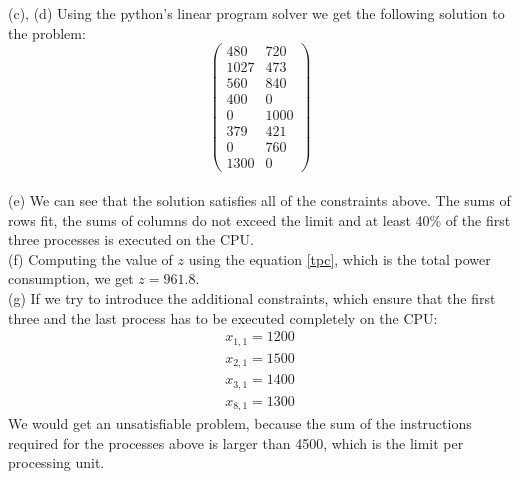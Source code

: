 \documentclass{article}
\begin{document}
(c), (d) Using the python's linear program solver we get the following solution to the problem:
\begin{equation*}
\begin{pmatrix}
    480 & 720 \\
    1027 & 473 \\
    560 & 840 \\
    400 & 0 \\
    0 & 1000 \\
    379 & 421\\ 
    0 & 760\\
    1300 & 0 
\end{pmatrix}
\end{equation*}\\

(e) We can see that the solution satisfies all of the constraints above. The sums of rows fit, the sums of columns do not exceed the limit and at least 40\% of the first three processes is executed on the CPU.\\

(f) Computing the value of $z$ using the equation \eqref{tpc}, which is the total power consumption, we get $z = 961.8$.\\

(g) If we try to introduce the additional constraints, which ensure that the first three and the last process has to be executed completely on the CPU:
\begin{equation*}
    \begin{split}
    x_{1, 1} = 1200\\
    x_{2, 1} = 1500\\
    x_{3, 1} = 1400\\
    x_{8, 1} = 1300
    \end{split}
\end{equation*}
We would get an unsatisfiable problem, because the sum of the instructions required for the processes above is larger than 4500, which is the limit per processing unit.
\end{document}
